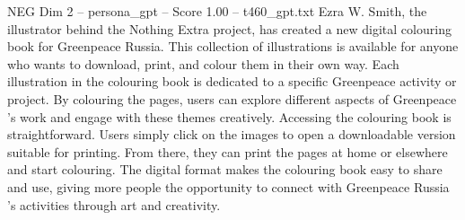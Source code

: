 \begin{textsample}{NEG Dim 2 – persona\_gpt – Score 1.00 – t460\_gpt.txt}  \label{ex:f2_neg_041}
Ezra W.
Smith, the illustrator behind the Nothing Extra project, has created a new digital colouring book for Greenpeace Russia.
This collection of illustrations is available for anyone who wants to download, print, and colour them in their own way.
Each illustration in the colouring book is dedicated to a specific Greenpeace activity or project.
By colouring the pages, users can explore different aspects of Greenpeace ’s work and engage with these themes creatively.
Accessing the colouring book is straightforward.
Users simply click on the images to open a downloadable version suitable for printing.
From there, they can print the pages at home or elsewhere and start colouring.
The digital format makes the colouring book easy to share and use, giving more people the opportunity to connect with Greenpeace Russia ’s activities through art and creativity.

\end{textsample}
